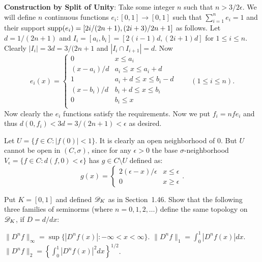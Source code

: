 \begin{enumerate}
\begin{itemize}
   \textbf{Construction by Split of Unity}:\newline
   Take some integer $n$ such that \(n > 3/2\epsilon\).
   We will define $n$ continuous functions 
   \(e_i: [0,1] \rightarrow [0,1]\) such that 
   \(\sum_{i=1}^n e_i = 1\) and 
   their support  \(\mathop{\rm supp}\nolimits(e_i) = [2i/(2n+1),(2i+3)/2n+1]\) as follows.
   Let \(d = 1/(2n+1)\) and \(I_i = [a_i,b_i] = [2(i-1)d, (2i+1)d]\)
   for \(1\leq i \leq n\).
   Clearly \(|I_i| = 3d = 3/(2n+1\) and \(|I_i \cap I_{i+1}| = d\).
   Now
   \begin{equation*}
     e_i(x) = \left\{\begin{array}{ll}
                     0          & x  \leq a_i \\
                     (x-a_i)/d  & a_i   \leq x \leq a_i + d \\
                     1          & a_i+d \leq x \leq b_i - d \\
                     (x-b_i)/d  & b_i+d \leq x \leq b_i \\
                     0          & b_i \leq x \\
                     \end{array}\right. \qquad (1\leq i \leq n).
   \end{equation*}
   Now clearly the \(e_i\) functions satisfy the requirements.
   Now we put \(f_i = n f e_i\) and 
   thus \(d(0,f_i) < 3d = 3/(2n+1) < \epsilon\) as desired.

   

   Let \(U=\{f\in C: |f(0)| < 1\}\). It is clearly 
   an open neighborhood of $0$.
   But $U$ cannot be open in \((C,\sigma)\), since for any \(\epsilon>0\)
   the base \(\sigma\)-neighborhood
   \(V_\epsilon = \{f\in C: d(f,0)<\epsilon\}\)
   has \(g\in C\setminus U\) defined as:
   \begin{equation*}
   g(x) = \left\{\begin{array}{ll}
                2(\epsilon-x)/\epsilon & x \leq \epsilon \\
                0                      & x \geq \epsilon 
                \end{array}\right. .
   \end{equation*}
\end{itemize}

\begin{excopy}
Put \(K=[0,1]\) and defined \(\mathscr{D}_K\) as in Section~1.46.
Show that the following three families of seminorms (where \(n=0,1,2,\ldots\))
define the same topology on \(\mathscr{D}_K\), 
if \(D = d/dx\):
\begin{itemize}
  \(\|D^n f\|_\infty = \sup\{|D^n f(x)|: -\infty < x < \infty\}\).
  \(\|D^n f\|_1  = \int_0^1 |D^n f(x)|dx\).
  \(\|D^n f\|_2  = \left\{\int_0^1 |D^n f(x)|^2dx\right\}^{1/2}\).
\end{itemize}
\end{excopy}


\end{enumerate}
